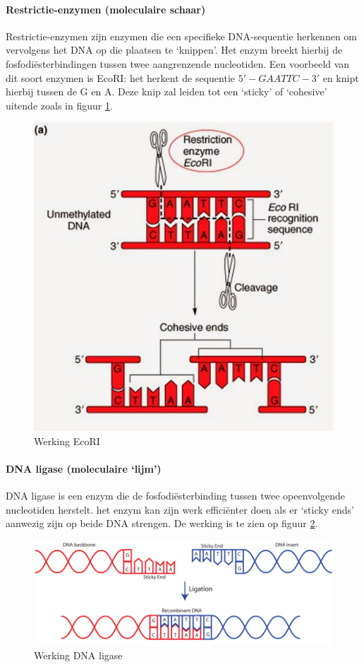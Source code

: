 \documentclass[a4paper,kul]{kulakarticle} %
\begin{document}
\paragraph{Restrictie-enzymen (moleculaire schaar)}
Restrictie-enzymen zijn enzymen die een specifieke DNA-sequentie herkennen om vervolgens het DNA op die plaatsen te `knippen'. Het enzym breekt hierbij de fosfodiësterbindingen tussen twee aangrenzende nucleotiden. Een voorbeeld van dit soort enzymen is EcoRI: het herkent de sequentie $5'-GAATTC-3'$ en knipt hierbij tussen de G en A. Deze knip zal leiden tot een `sticky' of `cohesive' uitende zoals in figuur \ref{fig:ecori}. 
\begin{figure}[h]
	\centering
	\includegraphics[width=0.5\linewidth]{EcoRI}
	\caption[EcoRI]{Werking EcoRI}
	\label{fig:ecori}
\end{figure}
\newpage
\paragraph{DNA ligase (moleculaire `lijm')}
DNA ligase is een enzym die de fosfodiësterbinding tussen twee opeenvolgende nucleotiden herstelt. het enzym kan zijn werk efficiënter doen als er `sticky ends' aanwezig zijn op beide DNA strengen. De werking is te zien op figuur \ref{fig:dnaligase}.
\begin{figure}[h]
	\centering
	\includegraphics[width=0.7\linewidth]{DNALigase}
	\caption[DNA ligase]{Werking DNA ligase}
	\label{fig:dnaligase}
\end{figure}
\end{document}

